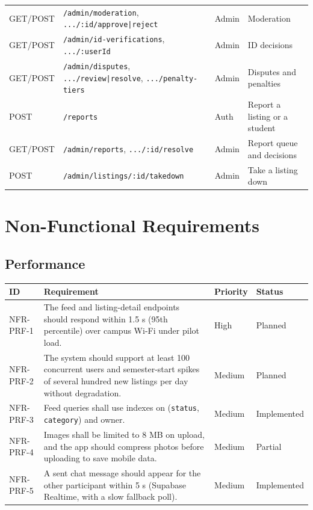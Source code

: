 \documentclass[11pt,a4paper]{scrreprt}
\newenvironment{reqtable}{%
  \small
  \begin{longtable}{>{\raggedright\arraybackslash\ttfamily\footnotesize}p{2.05cm} L{8.85cm} L{1.45cm} L{2.05cm}}
  \toprule
  \normalfont\normalsize\textbf{ID} & \textbf{Requirement} & \textbf{Priority} & \textbf{Status}\\
  \midrule\endhead
  \bottomrule\endfoot
}{\end{longtable}}
\newcommand{\impl}{Implemented}
\newcommand{\partl}{Partial}
\newcommand{\planned}{Planned}
\begin{document}
{\begin{longtable}{L{2.3cm} L{5.6cm} L{1.9cm} L{4.5cm}}
GET/POST & \texttt{/admin/moderation}, \texttt{.../:id/approve|reject} & Admin & Moderation\\
GET/POST & \texttt{/admin/id-verifications}, \texttt{.../:userId} & Admin & ID decisions\\
GET/POST & \texttt{/admin/disputes}, \texttt{.../review|resolve}, \texttt{.../penalty-tiers} & Admin & Disputes and penalties\\
POST & \texttt{/reports} & Auth & Report a listing or a student\\
GET/POST & \texttt{/admin/reports}, \texttt{.../:id/resolve} & Admin & Report queue and decisions\\
POST & \texttt{/admin/listings/:id/takedown} & Admin & Take a listing down\\
\bottomrule
\end{longtable}}

\chapter{Non-Functional Requirements}

\section{Performance}
\begin{reqtable}
NFR-PRF-1 & The feed and listing-detail endpoints should respond within 1.5 s (95th percentile) over campus Wi-Fi under pilot load. & High & \planned\\
NFR-PRF-2 & The system should support at least 100 concurrent users and semester-start spikes of several hundred new listings per day without degradation. & Medium & \planned\\
NFR-PRF-3 & Feed queries shall use indexes on (\texttt{status}, \texttt{category}) and owner. & Medium & \impl\\
NFR-PRF-4 & Images shall be limited to 8 MB on upload, and the app should compress photos before uploading to save mobile data. & Medium & \partl\\
NFR-PRF-5 & A sent chat message should appear for the other participant within 5 s (Supabase Realtime, with a slow fallback poll). & Medium & \impl\\
\end{reqtable}
\end{document}
